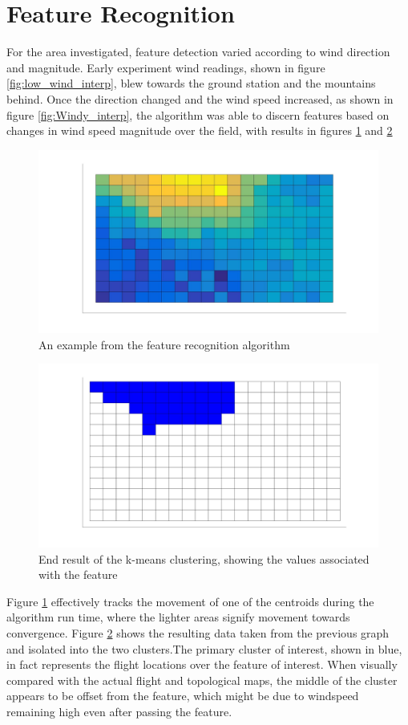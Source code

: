 \documentclass[12pt]{report}
\begin{document}
\section{Feature Recognition}
For the area investigated, feature detection varied according to wind direction and magnitude. Early experiment wind readings, shown in figure \ref{fig:low_wind_interp}, blew towards the ground station and the mountains behind. Once the direction changed and the wind speed increased, as shown in figure \ref{fig:Windy_interp}, the algorithm was able to discern features based on changes in wind speed magnitude over the field, with results in figures \ref{fig:k_means} and \ref{fig:final_cluster} 
\begin{figure}[!ht]
	\includegraphics[scale=0.2]{surface_mag.jpg}
	\caption{An example from the feature recognition algorithm}
	\label{fig:k_means}
\end{figure}
\begin{figure}[!ht]
	\includegraphics[scale=0.2]{clustered_cells.jpg}
	\caption{End result of the k-means clustering, showing the values associated with the feature}
	\label{fig:final_cluster}
\end{figure}
Figure \ref{fig:k_means} effectively tracks the movement of one of the centroids during the algorithm run time, where the lighter areas signify movement towards convergence. Figure \ref{fig:final_cluster} shows the resulting data taken from the previous graph and isolated into the two clusters.The primary cluster of interest, shown in blue, in fact represents the flight locations over the feature of interest. When visually compared with the actual flight and topological maps, the middle of the cluster appears to be offset from the feature, which might be due to windspeed remaining high even after passing the feature.
\end{document}
